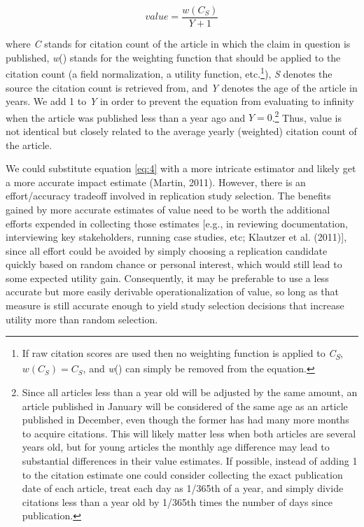 \documentclass[
  english,
  jou,floatsintext]{apa6}
\begin{document}
\begin{equation} 
  \tag{4}
  value=\frac{w(C_{S})}{Y+1}
  \label{eq:4}
\end{equation}

where \emph{C} stands for citation count of the article in which the claim in question is published, \emph{w}() stands for the weighting function that should be applied to the citation count (a field normalization, a utility function, etc.\footnote{If raw citation scores are used then no weighting function is applied to \emph{C\textsubscript{S}}, \(w(C_{S}) = C_{S}\), and \emph{w}() can simply be removed from the equation.}), \emph{S} denotes the source the citation count is retrieved from, and \emph{Y} denotes the age of the article in years. We add 1 to \emph{Y} in order to prevent the equation from evaluating to infinity when the article was published less than a year ago and \(Y=0\).\footnote{Since all articles less than a year old will be adjusted by the same amount, an article published in January will be considered of the same age as an article published in December, even though the former has had many more months to acquire citations. This will likely matter less when both articles are several years old, but for young articles the monthly age difference may lead to substantial differences in their value estimates. If possible, instead of adding 1 to the citation estimate one could consider collecting the exact publication date of each article, treat each day as 1/365th of a year, and simply divide citations less than a year old by 1/365th times the number of days since publication.} Thus, value is not identical but closely related to the average yearly (weighted) citation count of the article.

We could substitute equation \eqref{eq:4} with a more intricate estimator and likely get a more accurate impact estimate (Martin, 2011). However, there is an effort/accuracy tradeoff involved in replication study selection. The benefits gained by more accurate estimates of value need to be worth the additional efforts expended in collecting those estimates {[}e.g., in reviewing documentation, interviewing key stakeholders, running case studies, etc; Klautzer et al. (2011){]}, since all effort could be avoided by simply choosing a replication candidate quickly based on random chance or personal interest, which would still lead to some expected utility gain. Consequently, it may be preferable to use a less accurate but more easily derivable operationalization of value, so long as that measure is still accurate enough to yield study selection decisions that increase utility more than random selection.
\end{document}
